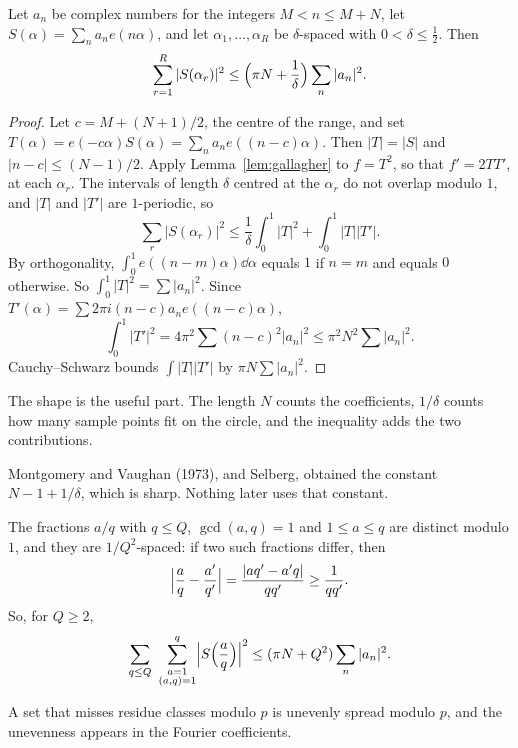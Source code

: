 \begin{theorem}\label{thm:largesieve}
Let $a_n$ be complex numbers for the integers $M<n\le M+N$, let $S(\alpha)=\sum_na_ne(n\alpha)$, and let $\alpha_1,\dots,\alpha_R$ be $\delta$-spaced with $0<\delta\le\frac12$. Then
\[
\sum_{r=1}^R|S(\alpha_r)|^2\le\Bigl(\pi N+\frac1\delta\Bigr)\sum_n|a_n|^2.
\]
\end{theorem}
\begin{proof}
Let $c=M+(N+1)/2$, the centre of the range, and set $T(\alpha)=e(-c\alpha)S(\alpha)=\sum_na_ne((n-c)\alpha)$. Then $|T|=|S|$ and $|n-c|\le(N-1)/2$. Apply Lemma~\ref{lem:gallagher} to $f=T^2$, so that $f'=2TT'$, at each $\alpha_r$. The intervals of length $\delta$ centred at the $\alpha_r$ do not overlap modulo $1$, and $|T|$ and $|T'|$ are $1$-periodic, so
\[
\sum_r|S(\alpha_r)|^2\le\frac1\delta\int_0^1|T|^2+\int_0^1|T||T'|.
\]
By orthogonality, $\int_0^1 e((n-m)\alpha)\dd\alpha$ equals $1$ if $n=m$ and equals $0$ otherwise. So $\int_0^1|T|^2=\sum|a_n|^2$. Since $T'(\alpha)=\sum 2\pi i(n-c)a_ne((n-c)\alpha)$,
\[
\int_0^1|T'|^2=4\pi^2\sum(n-c)^2|a_n|^2\le\pi^2N^2\sum|a_n|^2.
\]
Cauchy--Schwarz bounds $\int|T||T'|$ by $\pi N\sum|a_n|^2$.
\end{proof}

The shape is the useful part. The length $N$ counts the coefficients, $1/\delta$ counts how many sample points fit on the circle, and the inequality adds the two contributions.

\begin{remark}
Montgomery and Vaughan (1973), and Selberg, obtained the constant $N-1+1/\delta$, which is sharp. Nothing later uses that constant.
\end{remark}

The fractions $a/q$ with $q\le Q$, $\gcd(a,q)=1$ and $1\le a\le q$ are distinct modulo $1$, and they are $1/Q^2$-spaced: if two such fractions differ, then
\[
\Bigl|\frac aq-\frac{a'}{q'}\Bigr|=\frac{|aq'-a'q|}{qq'}\ge\frac1{qq'}.
\]
So, for $Q\ge2$,
\begin{equation}\label{eq:arithls}
\sum_{q\le Q}\ \sum_{\substack{a=1\\(a,q)=1}}^q\Bigl|S\Bigl(\frac aq\Bigr)\Bigr|^2\le(\pi N+Q^2)\sum_n|a_n|^2.
\end{equation}

A set that misses residue classes modulo $p$ is unevenly spread modulo $p$, and the unevenness appears in the Fourier coefficients.


